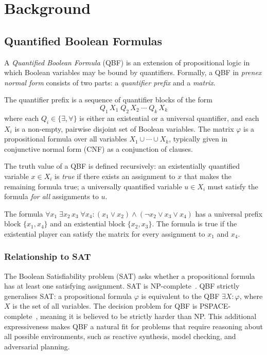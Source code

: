 \chapter{Background}\label{cha:background}

\section{Quantified Boolean Formulas}\label{sec:qbf}

A \emph{Quantified Boolean Formula} (QBF) is an extension of propositional logic in which Boolean variables may be bound by quantifiers. Formally, a QBF in \emph{prenex normal form} consists of two parts: a \emph{quantifier prefix} and a \emph{matrix}.

The quantifier prefix is a sequence of quantifier blocks of the form
\[
  Q_1\, X_1\; Q_2\, X_2\; \cdots\; Q_k\, X_k
\]
where each $Q_i \in \{\exists, \forall\}$ is either an existential or a universal quantifier, and each $X_i$ is a non-empty, pairwise disjoint set of Boolean variables. The matrix $\varphi$ is a propositional formula over all variables $X_1 \cup \cdots \cup X_k$, typically given in conjunctive normal form (CNF) as a conjunction of clauses.

The truth value of a QBF is defined recursively: an existentially quantified variable $x \in X_i$ is \emph{true} if there exists an assignment to $x$ that makes the remaining formula true; a universally quantified variable $u \in X_i$ must satisfy the formula \emph{for all} assignments to $u$.

\begin{example}
  The formula $\forall x_1\; \exists x_2\, x_3\; \forall x_4 \colon (x_1 \lor x_2) \land (\lnot x_2 \lor x_3 \lor x_4)$ has a universal prefix block $\{x_1, x_4\}$ and an existential block $\{x_2, x_3\}$. The formula is true if the existential player can satisfy the matrix for every assignment to $x_1$ and $x_4$.
\end{example}

\subsection{Relationship to SAT}\label{subsec:qbf-vs-sat}

The Boolean Satisfiability problem (SAT) asks whether a propositional formula has at least one satisfying assignment. SAT is NP-complete~\cite{Cook1971}. QBF strictly generalises SAT: a propositional formula $\varphi$ is equivalent to the QBF $\exists X\colon \varphi$, where $X$ is the set of all variables. The decision problem for QBF is PSPACE-complete~\cite{Stockmeyer1973}, meaning it is believed to be strictly harder than NP. This additional expressiveness makes QBF a natural fit for problems that require reasoning about all possible environments, such as reactive synthesis, model checking, and adversarial planning.

